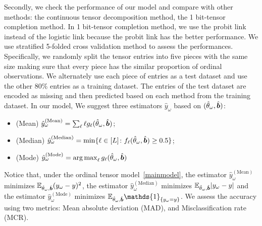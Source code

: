 \documentclass{article}
\theoremstyle{plain}
\theoremstyle{definition}
\begin{document}
Secondly, we check the performance of our model and compare with other methods: the continuous tensor decomposition method\cite{filipovic2015tucker}, the 1 bit-tensor completion method\cite{ghadermarzy2018learning}. In 1 bit-tensor completion method, we use the probit link instead of the logistic link because the probit link has the better performance. We use stratified 5-folded cross validation method to assess the performances. Specifically, we randomly split the tensor entries into five pieces with the same size making sure that every piece has the similar proportion of ordinal observations.
We alternately use each piece of entries as a test dataset and use the other $80\%$ entries as a training dataset. The entries of the test dataset are encoded as missing and then predicted based on each method from the training dataset. In our model, We suggest three estimators $\hat y_\omega$ based on $(\hat \theta_\omega,\hat {\bm{b}})$:
\begin{itemize}
\item (Mean) $\hat y^{(\text{Mean})}_\omega=\sum_\ell \ell g_\ell(\hat \theta_\omega,\hat {\bm{b}}) $;
\item (Median) $\hat y^{(\text{Median})}_\omega=\min\{\ell\in[L]\colon f_\ell(\hat \theta_\omega,\hat {\bm{b}})\geq 0.5\}$;
\item (Mode) $\hat y^{(\text{Mode})}_\omega=\operatorname*{arg\,max}_\ell g_\ell(\hat \theta_\omega,\hat {\bm{b}}) $
\end{itemize}
Notice that, under the ordinal tensor model~\eqref{mainmodel}, the estimator $\hat y^{(\text{Mean})}_\omega$ minimizes $\mathbb{E}_{\hat{\theta}_\omega,\hat{\bm{b}}}(y_\omega-y)^2$, the estimator $\hat y^{(\text{Median})}_\omega$ minimizes $\mathbb{E}_{\hat{\theta}_\omega,\hat{\bm{b}}}|y_\omega-y|$
and the estimator $\hat y^{(\text{Mode})}_\omega $ minimizes $\mathbb{E}_{\hat{\theta}_\omega,\hat{\mb}}\mathds{1}_{\{y_\omega=y\}}$.
We assess the accuracy using two metrics: Mean absolute deviation (MAD), and Misclassification rate (MCR).
\end{document}
